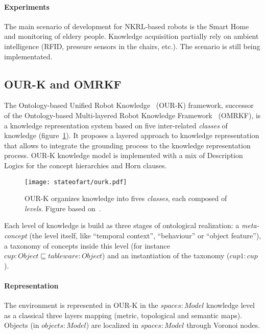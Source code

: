 \paragraph{Experiments} The main scenario of development for NKRL-based robots
is the Smart Home and monitoring of eldery people. Knowledge acquisition
partially rely on ambient intelligence (RFID, pressure sensors in the chairs,
etc.). The scenario is still being implementated.

\subsection{OUR-K and OMRKF}
\label{sect|omrkf}

The Ontology-based Unified Robot Knowledge~\cite{Lim2011} (OUR-K) framework,
successor of the Ontology-based Multi-layered Robot Knowledge
Framework~\cite{Suh2007} (OMRKF), is a knowledge representation system based on
five inter-related \emph{classes} of knowledge (figure~\ref{fig|omrkf}). It
proposes a layered approach to knowledge representation that allows to
integrate the grounding process to the knowledge representation process. OUR-K
knowledge model is implemented with a mix of Description Logics for the concept
hierarchies and Horn clauses.

\begin{figure}
    \centering
    \texttt{[image: stateofart/ourk.pdf]}

    \caption{OUR-K organizes knowledge into fives \emph{classes}, each composed
    of \emph{levels}. Figure based on~\cite{Lim2011}.}

    \label{fig|omrkf}
\end{figure}

Each level of knowledge is build as three stages of ontological realization: a
\emph{meta-concept} (the level itself, like ``temporal context'', ``behaviour''
or ``object feature''), a taxonomy of concepts inside this level (for instance
$cup : Object \sqsubseteq tableware : Object$) and an instantiation of the
taxonomy ($cup1 : cup$).

\paragraph{Representation} The environment is represented in OUR-K in the
$spaces : Model$ knowledge level as a classical three layers mapping (metric,
topological and semantic maps). Objects (in $objects : Model$) are localized in
$spaces : Model$ through Voronoi nodes.

